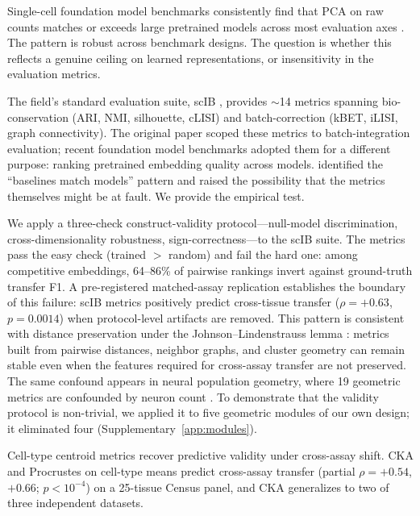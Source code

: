 \documentclass[11pt]{article}
\begin{document}
Single-cell foundation model benchmarks consistently find that PCA on raw counts matches or exceeds large pretrained models across most evaluation axes \citep{wu2025scfm, vcbench2026, unifiedscfm2026, cellxgeneintegration2026}. The pattern is robust across benchmark designs. The question is whether this reflects a genuine ceiling on learned representations, or insensitivity in the evaluation metrics.

The field's standard evaluation suite, scIB \citep{luecken2022scib}, provides $\sim$14 metrics spanning bio-conservation (ARI, NMI, silhouette, cLISI) and batch-correction (kBET, iLISI, graph connectivity). The original paper scoped these metrics to batch-integration evaluation; recent foundation model benchmarks \citep{wu2025scfm, vcbench2026, unifiedscfm2026, cellxgeneintegration2026} adopted them for a different purpose: ranking pretrained embedding quality across models. \citet{wu2025scfm} identified the ``baselines match models'' pattern and raised the possibility that the metrics themselves might be at fault. We provide the empirical test.

We apply a three-check construct-validity protocol---null-model discrimination, cross-dimensionality robustness, sign-correctness---to the scIB suite. The metrics pass the easy check (trained $>$ random) and fail the hard one: among competitive embeddings, 64--86\% of pairwise rankings invert against ground-truth transfer F1. A pre-registered matched-assay replication establishes the boundary of this failure: scIB metrics positively predict cross-tissue transfer ($\rho = +0.63$, $p = 0.0014$) when protocol-level artifacts are removed. This pattern is consistent with distance preservation under the Johnson--Lindenstrauss lemma \citep{johnsonlindenstrauss1984}: metrics built from pairwise distances, neighbor graphs, and cluster geometry can remain stable even when the features required for cross-assay transfer are not preserved. The same confound appears in neural population geometry, where 19 geometric metrics are confounded by neuron count \citep{tower2026bracket}. To demonstrate that the validity protocol is non-trivial, we applied it to five geometric modules of our own design; it eliminated four (Supplementary~\ref{app:modules}).

Cell-type centroid metrics recover predictive validity under cross-assay shift. CKA and Procrustes on cell-type means predict cross-assay transfer (partial $\rho = +0.54$, $+0.66$; $p < 10^{-4}$) on a 25-tissue Census panel, and CKA generalizes to two of three independent datasets.
\end{document}
